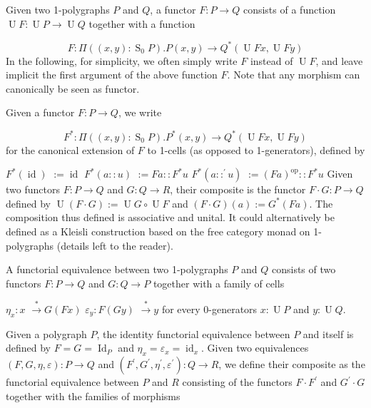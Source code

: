  
Given two 1-polygraphs $P$ and $Q$, a functor $F:P\to Q$ consists of a function $\operatorname{U}F:\operatorname{U}P\to\operatorname{U}Q$ together with a function\par
    \[F:\Pi((x,y):\operatorname{S}_{0}P).P(x,y)\to Q^{*}(\operatorname{U}Fx,\operatorname{U}Fy)\]    
In the following, for simplicity, we often simply write $F$ instead of $\operatorname{U}F$, and leave implicit the first argument of the above function $F$. Note that any morphism can canonically be seen as functor.\par
 
 
 
Given a functor $F:P\to Q$, we write\par
    \[F^{*}:\Pi((x,y):\operatorname{S}_{0}P).P^{*}(x,y)\to Q^{*}(\operatorname{U}Fx,\operatorname{U}Fy)\]    
for the canonical extension of $F$ to 1-cells (as opposed to 1-generators), defined by\par
    $\displaystyle F^{*}(\operatorname{id})$ $\displaystyle:=\operatorname{id}$ $\displaystyle F^{*}(a::u)$ $\displaystyle:=Fa::F^{*}u$ $\displaystyle F^{*}(a::^{\prime}u)$ $\displaystyle:=(Fa)^{\mathrm{op}}::F^{*}u$    
Given two functors $F:P\to Q$ and $G:Q\to R$, their composite is the functor $F\cdot{}G:P\to Q$ defined by $\operatorname{U}(F\cdot{}G):=\operatorname{U}G\circ\operatorname{U}F$ and $(F\cdot{}G)(a):=G^{*}(Fa)$. The composition thus defined is associative and unital. It could alternatively be defined as a Kleisli construction based on the free category monad on 1-polygraphs (details left to the reader).\par
 
 
 
A functorial equivalence between two 1-polygraphs $P$ and $Q$ consists of two functors $F:P\to Q$ and $G:Q\to P$ together with a family of cells\par
    $\displaystyle\eta_{x}:x$ $\displaystyle\overset{*}{\to}G(Fx)$ $\displaystyle\varepsilon_{y}:F(Gy)$ $\displaystyle\overset{*}{\to}y$    
for every 0-generators $x:\operatorname{U}P$ and $y:\operatorname{U}Q$.\par
 
 
 
Given a polygraph $P$, the identity functorial equivalence between $P$ and itself is defined by $F=G=\operatorname{Id}_{P}$ and $\eta_{x}=\varepsilon_{x}=\operatorname{id}_{x}$. Given two equivalences $(F,G,\eta,\varepsilon):P\to Q$ and $(F^{\prime},G^{\prime},\eta^{\prime},\varepsilon^{\prime}):Q\to R$, we define their composite as the functorial equivalence between $P$ and $R$ consisting of the functors $F\cdot{}F^{\prime}$ and $G^{\prime}\cdot{}G$ together with the families of morphisms\par
     
